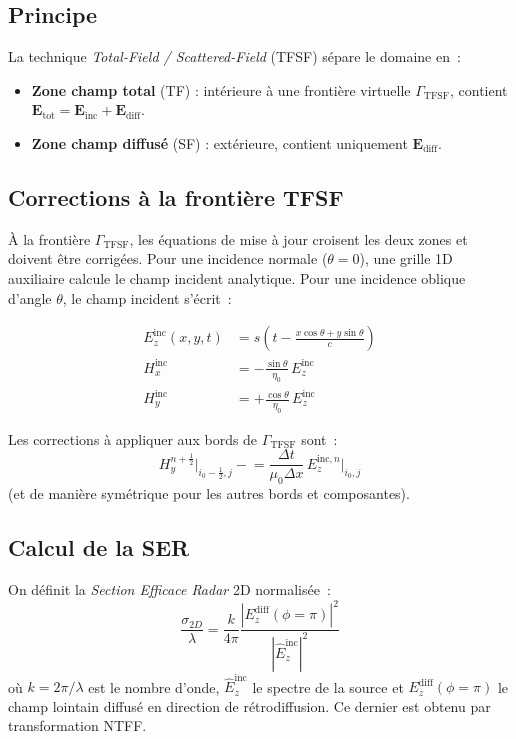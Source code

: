 \documentclass[12pt,a4paper]{article}
\newcommand{\vE}{\bm{E}}
\newcommand{\dx}{\Delta x}
\newcommand{\dt}{\Delta t}
\newcommand{\half}{\tfrac{1}{2}}
\numberwithin{equation}{section}
\numberwithin{figure}{section}
\numberwithin{table}{section}
\begin{document}
\subsection{Principe}

La technique \emph{Total-Field / Scattered-Field} (TFSF) sépare le domaine en~:
\begin{itemize}
    \item \textbf{Zone champ total} (TF) : intérieure à une frontière virtuelle
    $\Gamma_{\text{TFSF}}$, contient $\vE_{\text{tot}} = \vE_{\text{inc}} + \vE_{\text{diff}}$.
    \item \textbf{Zone champ diffusé} (SF) : extérieure, contient uniquement
    $\vE_{\text{diff}}$.
\end{itemize}

\subsection{Corrections à la frontière TFSF}

À la frontière $\Gamma_{\text{TFSF}}$, les équations de mise à jour croisent les
deux zones et doivent être corrigées. Pour une incidence normale ($\theta = 0$),
une grille 1D auxiliaire calcule le champ incident analytique.
Pour une incidence oblique d'angle $\theta$, le champ incident s'écrit~:

\begin{align}
    E_z^{\text{inc}}(x,y,t) &= s\!\left(t - \frac{x\cos\theta + y\sin\theta}{c}\right) \\
    H_x^{\text{inc}} &= -\frac{\sin\theta}{\eta_0}\,E_z^{\text{inc}} \\
    H_y^{\text{inc}} &= +\frac{\cos\theta}{\eta_0}\,E_z^{\text{inc}}
\end{align}

Les corrections à appliquer aux bords de $\Gamma_{\text{TFSF}}$ sont~:
\begin{equation}
    H_y^{n+\half}\big|_{i_0-\half, j} \mathrel{-}=
        \frac{\dt}{\mu_0\dx}\,E_z^{\text{inc},n}\big|_{i_0, j}
\end{equation}
(et de manière symétrique pour les autres bords et composantes).

\subsection{Calcul de la SER}

On définit la \emph{Section Efficace Radar} 2D normalisée~:
\begin{equation}
    \frac{\sigma_{2D}}{\lambda} = \frac{k}{4\pi}
    \frac{\left|E_z^{\text{diff}}(\phi=\pi)\right|^2}
         {\left|\hat{E}_z^{\text{inc}}\right|^2}
    \label{eq:SER_def}
\end{equation}
où $k = 2\pi/\lambda$ est le nombre d'onde,
$\hat{E}_z^{\text{inc}}$ le spectre de la source et
$E_z^{\text{diff}}(\phi=\pi)$ le champ lointain diffusé en direction de
rétrodiffusion. Ce dernier est obtenu par transformation NTFF.
\end{document}
